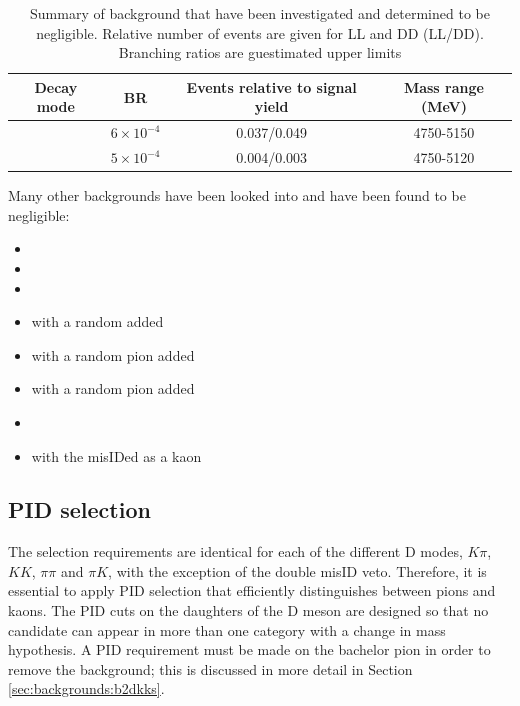 \begin{table}[h]
\centering
\begin{tabular}{cccc}
\hline
Decay mode & BR & Events relative to signal yield & Mass range (MeV) \\
\hline
\decay{\Bm}{\Dz\Kstarm\piz} & $6 \times 10^{-4}$ & 0.037/0.049 & 4750-5150 \\
\decay{\Bs}{\Dz\KS\pi\pi} & $5 \times 10^{-4}$ & 0.004/0.003 & 4750-5120 \\
\hline
\end{tabular}
\caption{Summary of background that have been investigated and determined to be negligible. Relative number of events are given for LL and DD (LL/DD). Branching ratios are guestimated upper limits}
\label{ignoredbackgrounds}
\end{table}


Many other backgrounds have been looked into and have been found to be negligible:

\begin{itemize}
\item \decay{\Bs}{\Dzb\Kstarz(\Kstarp[\pim])}
\item \decay{\Bs}{\Dstarp\Kstarp}
\item \decay{\Bs}{\Dspm(\kaon\kaon\pi)\Kstarpm}
\item \decay{\Bu}{\D\pi} with a random \KS added
\item \decay{\Bd}{\D\KS} with a  random pion added
\item \decay{\Bs}{\D\KS} with a random pion added
\item \decay{\Bu}{\D(\KS\pi\pi)\Kp}
\item {} with the \proton misIDed as a kaon
\end{itemize}


\subsection{PID selection}
\label{sec:selection:pid}

The selection requirements are identical for each of the different D modes, $K\pi$, $KK$, $\pi\pi$ and $\pi K$, with the exception of the double misID veto. Therefore, it is essential to apply PID selection that efficiently distinguishes between pions and kaons. The PID cuts on the daughters of the D meson are designed so that no  candidate can appear in more than one category with a change in mass hypothesis. A PID requirement must be made on the bachelor pion in order to remove the \decay{\B}{\D\KS\kaon} background; this is discussed in more detail in Section \ref{sec:backgrounds:b2dkks}. 

